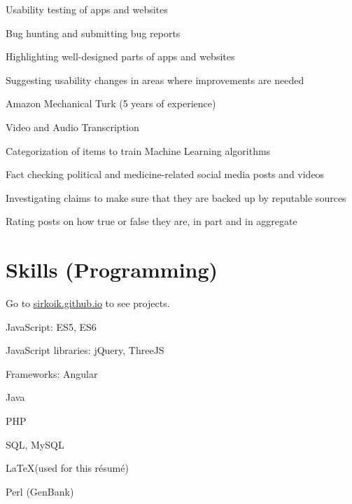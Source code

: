 \documentclass[]{deedy-resume-openfont}
\begin{document}
\begin{tightemize}
\item Usability testing of apps and websites
\item Bug hunting and submitting bug reports
\item Highlighting well-designed parts of apps and websites
\item Suggesting usability changes in areas where improvements are needed
\end{tightemize}
\sectionsep

\begin{tightemize}
\item Amazon Mechanical Turk (5 years of experience)
\item Video and Audio Transcription
\item Categorization of items to train Machine Learning algorithms
\end{tightemize}
\sectionsep

\begin{tightemize}
\item Fact checking political and medicine-related social media posts and videos
\item Investigating claims to make sure that they are backed up by reputable sources
\item Rating posts on how true or false they are, in part and in aggregate
\end{tightemize}
\sectionsep

\newpage

\section{Skills (Programming)}
Go to \href{https://sirkoik.github.io#projects}{\underline{sirkoik.github.io}} to see projects.
\sectionsep

\descript{}
\begin{tightemize}
\item JavaScript: ES5, ES6
\item JavaScript libraries: jQuery, ThreeJS
\item Frameworks: Angular
\item Java
\item PHP
\item SQL, MySQL
\item \LaTeX \xspace (used for this r\'esum\'e)
\item Perl (GenBank)
\end{tightemize}
\sectionsep
\end{document}
